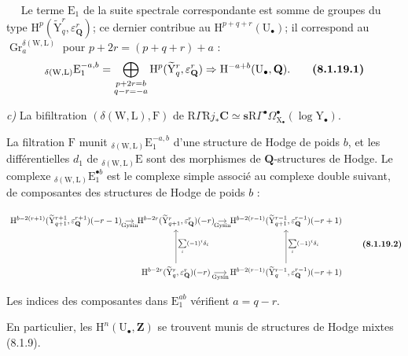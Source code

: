 \documentclass[11pt,leqno]{article}
\newcommand{\Page}[1]{\ifvmode\noindent\else\unskip\ \fi{\footnotesize\textcolor{gray}{[p.\,#1]}}\ \ignorespaces}
\begin{document}
\Page{35}
Le terme \(\mathrm{E}_{1}\) de la suite spectrale correspondante est somme de groupes du type \(\mathrm{H}^{p}(\widetilde{\mathrm{Y}}_{q}^{r},\varepsilon_{\mathbf{Q}}^{r})\); ce dernier contribue au \(\mathrm{H}^{p+q+r}(\mathrm{U}_{\bullet})\); il correspond au \(\operatorname{Gr}_{a}^{\delta(\mathrm{W},\mathrm{L})}\) pour \(p+2r=(p+q+r)+a\) :
\[
{}_{\delta(\mathrm{W},\mathrm{L})}\mathrm{E}_{1}^{-a,b}
=
\bigoplus_{\substack{p+2r=b\\q-r=-a}}
\mathrm{H}^{p}(\widetilde{\mathrm{Y}}_{q}^{r},\varepsilon_{\mathbf{Q}}^{r})
\Rightarrow
\mathrm{H}^{-a+b}(\mathrm{U}_{\bullet},\mathbf{Q}).
\tag*{\textbf{(8.1.19.1)}}
\]

\textit{c)} La bifiltration \((\delta(\mathrm{W},\mathrm{L}),\mathrm{F})\) de \(\mathrm{R}\Gamma\mathrm{R}j_{\ast}\mathbf{C}\simeq\mathbf{s}\mathrm{R}\Gamma^\bullet\Omega_{\mathrm{X}_{\bullet}}^\bullet(\log\mathrm{Y}_{\bullet})\).

La filtration \(\mathrm{F}\) munit \({}_{\delta(\mathrm{W},\mathrm{L})}\mathrm{E}_{1}^{-a,b}\) d’une structure de Hodge de poids \(b\), et les différentielles \(d_{1}\) de \({}_{\delta(\mathrm{W},\mathrm{L})}\mathrm{E}\) sont des morphismes de \(\mathbf{Q}\)-structures de Hodge. Le complexe \({}_{\delta(\mathrm{W},\mathrm{L})}\mathrm{E}_{1}^{\bullet b}\) est le complexe simple associé au complexe double suivant, de composantes des structures de Hodge de poids \(b\) :

{\small
\[
\begin{tikzcd}[ampersand replacement=\&, column sep=1em, row sep=4em]
\mathrm{H}^{b-2(r+1)}
(\widetilde{\mathrm{Y}}_{q+1}^{r+1},\varepsilon_{\mathbf{Q}}^{r+1})(-r-1)
\arrow[r, "\mathrm{Gysin}"']
\&
\mathrm{H}^{b-2r}
(\widetilde{\mathrm{Y}}_{q+1}^{r},\varepsilon_{\mathbf{Q}}^{r})(-r)
\arrow[r, "\mathrm{Gysin}"']
\&
\mathrm{H}^{b-2(r-1)}
(\widetilde{\mathrm{Y}}_{q+1}^{r-1},\varepsilon_{\mathbf{Q}}^{r-1})(-r+1)
\\
\&
\mathrm{H}^{b-2r}
(\widetilde{\mathrm{Y}}_{q}^{r},\varepsilon_{\mathbf{Q}}^{r})(-r)
\arrow[u, "{\sum\limits_i(-1)^i\delta_i}"']
\arrow[r, "\mathrm{Gysin}"']
\&
\mathrm{H}^{b-2(r-1)}
(\widetilde{\mathrm{Y}}_{q}^{r-1},\varepsilon_{\mathbf{Q}}^{r-1})(-r+1)
\arrow[u, "{\sum\limits_i(-1)^i\delta_i}"']
\end{tikzcd}
\tag*{\textbf{(8.1.19.2)}}
\]
}

Les indices des composantes dans \(\mathrm{E}_{1}^{ab}\) vérifient \(a=q-r\).

En particulier, les \(\mathrm{H}^{n}(\mathrm{U}_{\bullet},\mathbf{Z})\) se trouvent munis de structures de Hodge mixtes (8.1.9).
\end{document}

